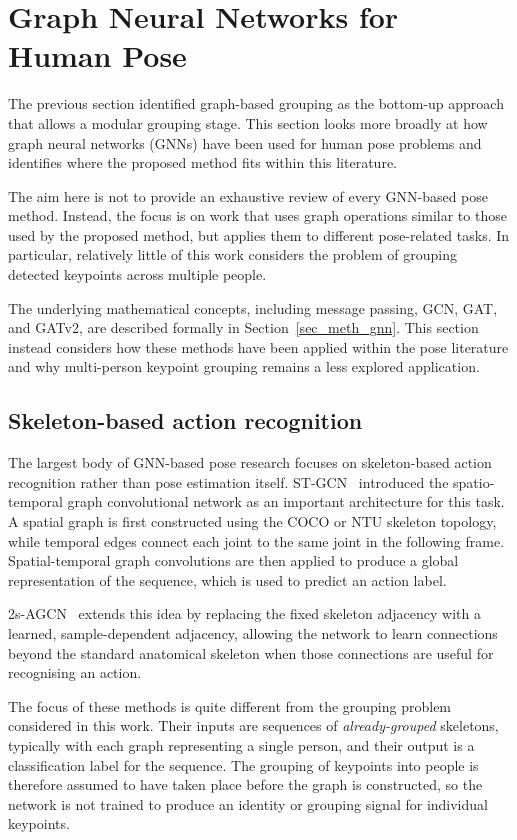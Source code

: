 \section{Graph Neural Networks for Human Pose}
\label{sec_lit_gnn_pose}

The previous section identified graph-based grouping as the bottom-up approach that allows a modular grouping stage.
This section looks more broadly at how graph neural networks (GNNs) have been used for human pose problems
and identifies where the proposed method fits within this literature.

The aim here is not to provide an exhaustive review of every GNN-based pose method.
Instead, the focus is on work that uses graph operations similar to those used by the proposed method,
but applies them to different pose-related tasks.
In particular,
relatively little of this work considers the problem of grouping detected keypoints across multiple people.

The underlying mathematical concepts, including message passing, GCN, GAT, and GATv2,
are described formally in Section~\ref{sec_meth_gnn}.
This section instead considers how these methods have been applied within the pose literature
and why multi-person keypoint grouping remains a less explored application.

\subsection{Skeleton-based action recognition}
\label{sec_lit_gnn_pose_action}

The largest body of GNN-based pose research focuses on skeleton-based action recognition
rather than pose estimation itself.
ST-GCN~\cite{yan2018stgcn} introduced the spatio-temporal graph convolutional network
as an important architecture for this task.
A spatial graph is first constructed using the COCO or NTU skeleton topology,
while temporal edges connect each joint to the same joint in the following frame.
Spatial-temporal graph convolutions are then applied to produce a global representation of the sequence,
which is used to predict an action label.

2s-AGCN~\cite{shi2019twostreamadaptive} extends this idea
by replacing the fixed skeleton adjacency with a learned, sample-dependent adjacency,
allowing the network to learn connections beyond the standard anatomical skeleton
when those connections are useful for recognising an action.

The focus of these methods is quite different from the grouping problem considered in this work.
Their inputs are sequences of \emph{already-grouped} skeletons,
typically with each graph representing a single person,
and their output is a classification label for the sequence.
The grouping of keypoints into people is therefore assumed to have taken place before the graph is constructed,
so the network is not trained to produce an identity or grouping signal for individual keypoints.

